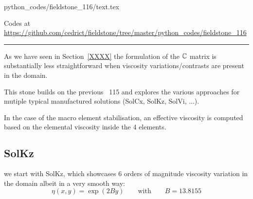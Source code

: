 \begin{flushright} {\tiny {\color{gray} python\_codes/fieldstone\_116/text.tex}} \end{flushright}



\begin{center}
Codes at \url{https://github.com/cedrict/fieldstone/tree/master/python_codes/fieldstone_116}
\end{center}

\par\noindent\rule{\textwidth}{0.4pt}


As we have seen in Section~\ref{XXXX} the formulation of the ${\mathbb{C}}$ matrix is substantially 
less straightforward when viscosity variations/contrasts are present in the domain. 

This stone builds on the previous \stone~115 and explores the various approaches for 
mutiple typical manufactured solutions (SolCx, SolKz, SolVi, ...).





In the case of the macro element stabilisation, an effective viscosity is computed based on the 
elemental viscosity inside the 4 elements. 


\subsection*{SolKz}

we start with SolKz, which showcases 6 orders of magnitude viscosity variation in the 
domain albeit in a very smooth way:
\[
\eta(x,y)=\exp (2 B y) \qquad \text{with} \qquad B=13.8155
\]




